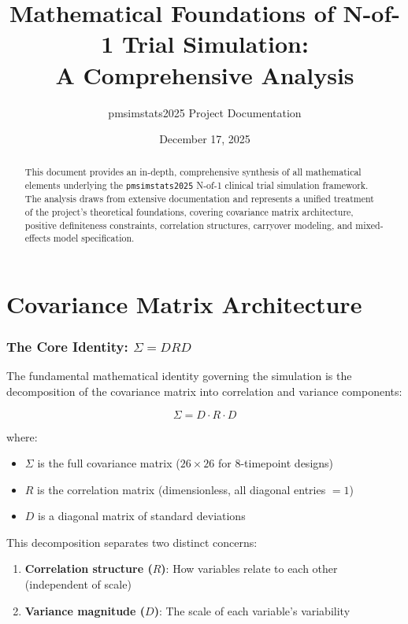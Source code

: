 \documentclass[11pt]{article}
\title{Mathematical Foundations of N-of-1 Trial Simulation:\\
A Comprehensive Analysis}
\author{pmsimstats2025 Project Documentation}
\date{December 17, 2025}
\theoremstyle{definition}
\begin{document}
\maketitle

\begin{abstract}
This document provides an in-depth, comprehensive synthesis of all mathematical
elements underlying the \texttt{pmsimstats2025} N-of-1 clinical trial simulation
framework. The analysis draws from extensive documentation and represents a
unified treatment of the project's theoretical foundations, covering covariance
matrix architecture, positive definiteness constraints, correlation structures,
carryover modeling, and mixed-effects model specification.
\end{abstract}

\tableofcontents
\newpage

\part{Covariance Matrix Architecture}

\section{The Core Identity: $\Sigma = DRD$}

The fundamental mathematical identity governing the simulation is the
decomposition of the covariance matrix into correlation and variance components:

\begin{equation}
\boxed{\Sigma = D \cdot R \cdot D}
\end{equation}

where:
\begin{itemize}
    \item $\Sigma$ is the full covariance matrix ($26 \times 26$ for 8-timepoint designs)
    \item $R$ is the correlation matrix (dimensionless, all diagonal entries $= 1$)
    \item $D$ is a diagonal matrix of standard deviations
\end{itemize}

This decomposition separates two distinct concerns:
\begin{enumerate}
    \item \textbf{Correlation structure ($R$)}: How variables relate to each other
    (independent of scale)
    \item \textbf{Variance magnitude ($D$)}: The scale of each variable's variability
\end{enumerate}
\end{document}
